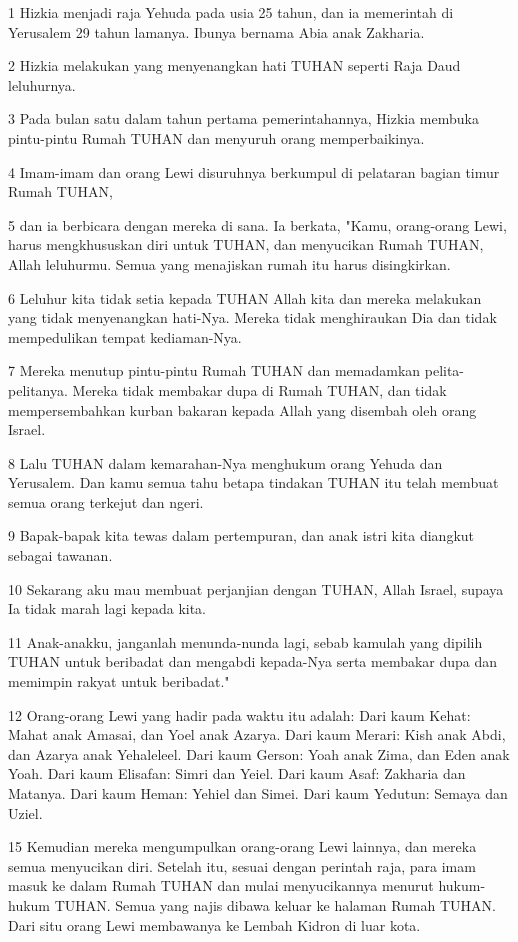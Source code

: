 \par 1 Hizkia menjadi raja Yehuda pada usia 25 tahun, dan ia memerintah di Yerusalem 29 tahun lamanya. Ibunya bernama Abia anak Zakharia.
\par 2 Hizkia melakukan yang menyenangkan hati TUHAN seperti Raja Daud leluhurnya.
\par 3 Pada bulan satu dalam tahun pertama pemerintahannya, Hizkia membuka pintu-pintu Rumah TUHAN dan menyuruh orang memperbaikinya.
\par 4 Imam-imam dan orang Lewi disuruhnya berkumpul di pelataran bagian timur Rumah TUHAN,
\par 5 dan ia berbicara dengan mereka di sana. Ia berkata, "Kamu, orang-orang Lewi, harus mengkhususkan diri untuk TUHAN, dan menyucikan Rumah TUHAN, Allah leluhurmu. Semua yang menajiskan rumah itu harus disingkirkan.
\par 6 Leluhur kita tidak setia kepada TUHAN Allah kita dan mereka melakukan yang tidak menyenangkan hati-Nya. Mereka tidak menghiraukan Dia dan tidak mempedulikan tempat kediaman-Nya.
\par 7 Mereka menutup pintu-pintu Rumah TUHAN dan memadamkan pelita-pelitanya. Mereka tidak membakar dupa di Rumah TUHAN, dan tidak mempersembahkan kurban bakaran kepada Allah yang disembah oleh orang Israel.
\par 8 Lalu TUHAN dalam kemarahan-Nya menghukum orang Yehuda dan Yerusalem. Dan kamu semua tahu betapa tindakan TUHAN itu telah membuat semua orang terkejut dan ngeri.
\par 9 Bapak-bapak kita tewas dalam pertempuran, dan anak istri kita diangkut sebagai tawanan.
\par 10 Sekarang aku mau membuat perjanjian dengan TUHAN, Allah Israel, supaya Ia tidak marah lagi kepada kita.
\par 11 Anak-anakku, janganlah menunda-nunda lagi, sebab kamulah yang dipilih TUHAN untuk beribadat dan mengabdi kepada-Nya serta membakar dupa dan memimpin rakyat untuk beribadat."
\par 12 Orang-orang Lewi yang hadir pada waktu itu adalah: Dari kaum Kehat: Mahat anak Amasai, dan Yoel anak Azarya. Dari kaum Merari: Kish anak Abdi, dan Azarya anak Yehaleleel. Dari kaum Gerson: Yoah anak Zima, dan Eden anak Yoah. Dari kaum Elisafan: Simri dan Yeiel. Dari kaum Asaf: Zakharia dan Matanya. Dari kaum Heman: Yehiel dan Simei. Dari kaum Yedutun: Semaya dan Uziel.
\par 15 Kemudian mereka mengumpulkan orang-orang Lewi lainnya, dan mereka semua menyucikan diri. Setelah itu, sesuai dengan perintah raja, para imam masuk ke dalam Rumah TUHAN dan mulai menyucikannya menurut hukum-hukum TUHAN. Semua yang najis dibawa keluar ke halaman Rumah TUHAN. Dari situ orang Lewi membawanya ke Lembah Kidron di luar kota.

